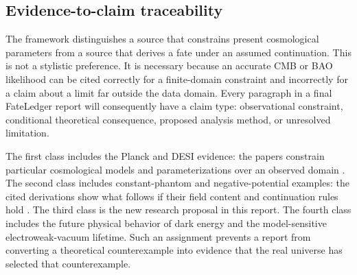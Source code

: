 \documentclass[conference]{IEEEtran}
\begin{document}
\subsection{Evidence-to-claim traceability}

The framework distinguishes a source that constrains present cosmological parameters from a source that derives a fate under an assumed continuation. This is not a stylistic preference. It is necessary because an accurate CMB or BAO likelihood can be cited correctly for a finite-domain constraint and incorrectly for a claim about a limit far outside the data domain. Every paragraph in a final FateLedger report will consequently have a claim type: observational constraint, conditional theoretical consequence, proposed analysis method, or unresolved limitation.

The first class includes the Planck and DESI evidence: the papers constrain particular cosmological models and parameterizations over an observed domain \cite{planck2018,desi2025}. The second class includes constant-phantom and negative-potential examples: the cited derivations show what follows if their field content and continuation rules hold \cite{caldwell2003,kallosh2003}. The third class is the new research proposal in this report. The fourth class includes the future physical behavior of dark energy and the model-sensitive electroweak-vacuum lifetime. Such an assignment prevents a report from converting a theoretical counterexample into evidence that the real universe has selected that counterexample.
\end{document}
